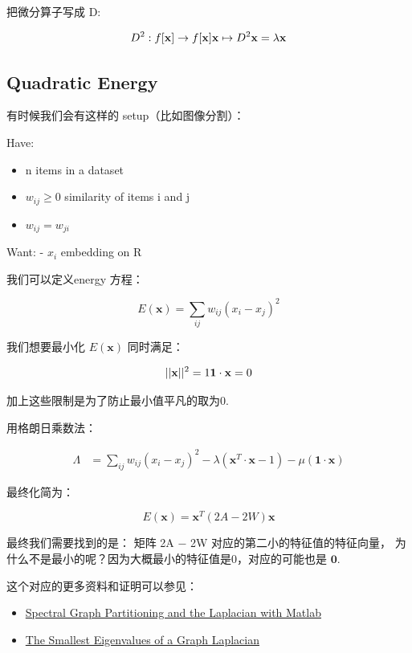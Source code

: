 \documentclass[
]{book}
\providecommand{\tightlist}{%
  \setlength{\itemsep}{0pt}\setlength{\parskip}{0pt}}
\begin{document}
把微分算子写成 D:

\[
D^2 : f[\mathbf{x}] \to f[\mathbf{x}]\\
\mathbf{x} \mapsto D^2\mathbf{x} = \lambda \mathbf{x}
\]

\hypertarget{quadratic-energy}{%
\subsection{Quadratic Energy}\label{quadratic-energy}}

有时候我们会有这样的 setup（比如图像分割）：

Have:

\begin{itemize}
\tightlist
\item
  n items in a dataset
\item
  \(w_{ij} ≥ 0\) similarity of items i and j
\item
  \(w_{ij} = w_{ji}\)
\end{itemize}

Want:
- \(x_{i}\) embedding on R

我们可以定义energy 方程：

\[
E(\mathbf{x}) = \sum_{ij} w_{ij} (x_i - x_j)^2
\]

我们想要最小化 \(E(\mathbf{x})\) 同时满足：

\[
||\mathbf{x}||^2 = 1 \\
\mathbf{1} \cdot \mathbf{x} = 0
\]

加上这些限制是为了防止最小值平凡的取为0.

用格朗日乘数法：

\[
\begin{aligned}
\Lambda &= \sum_{ij} w_{ij} (x_i - x_j)^2 - \lambda (\mathbf{x}^T \cdot \mathbf{x} - 1) - \mu (\mathbf{1} \cdot \mathbf{x}) {}
\end{aligned}
\]

最终化简为：

\[
E(\mathbf{x}) = \mathbf{x}^T(2A − 2W) \mathbf{x}
\]

最终我们需要找到的是： 矩阵 2A − 2W 对应的第二小的特征值的特征向量， 为什么不是最小的呢？因为大概最小的特征值是0，对应的可能也是 \(\mathbf{0}\).

这个对应的更多资料和证明可以参见：

\begin{itemize}
\item
  \href{https://www.cs.purdue.edu/homes/dgleich/demos/matlab/spectral/spectral.html}{Spectral Graph Partitioning and the Laplacian with Matlab}
\item
  \href{http://blog.shriphani.com/2015/04/06/the-smallest-eigenvalues-of-a-graph-laplacian/}{The Smallest Eigenvalues of a Graph Laplacian}
\end{itemize}
\end{document}
